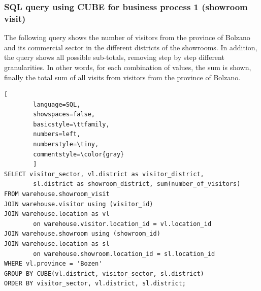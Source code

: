 \documentclass[letterpaper,12pt]{article}
\begin{document}
\subsubsection{SQL query using CUBE for business process 1 (showroom visit)}

The following query shows the number of visitors from the province of Bolzano and its commercial sector in the different districts of the showrooms. In addition, the query shows all possible sub-totals, removing step by step different granularities. In other words, for each combination of values, the sum is shown, finally the total sum of all visits from visitors from the province of Bolzano.

\begin{lstlisting}[
        language=SQL,
        showspaces=false,
        basicstyle=\ttfamily,
        numbers=left,
        numberstyle=\tiny,
        commentstyle=\color{gray}
        ]
SELECT visitor_sector, vl.district as visitor_district, 
        sl.district as showroom_district, sum(number_of_visitors)
FROM warehouse.showroom_visit
JOIN warehouse.visitor using (visitor_id)
JOIN warehouse.location as vl 
        on warehouse.visitor.location_id = vl.location_id 
JOIN warehouse.showroom using (showroom_id)
JOIN warehouse.location as sl 
        on warehouse.showroom.location_id = sl.location_id
WHERE vl.province = 'Bozen'
GROUP BY CUBE(vl.district, visitor_sector, sl.district)
ORDER BY visitor_sector, vl.district, sl.district;
\end{lstlisting}
\end{document}

